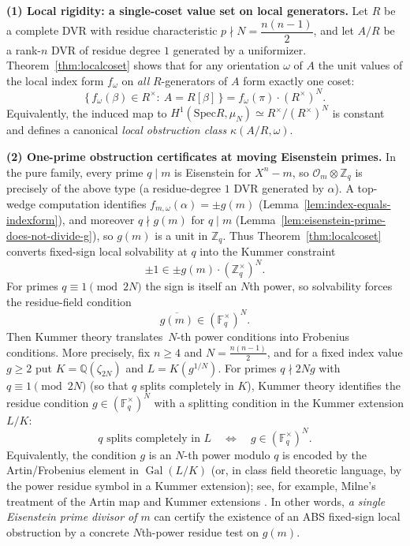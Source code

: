 \documentclass[11pt,letterpaper]{amsart}
\newcommand{\Z}{\mathbb{Z}}
\newcommand{\Q}{\mathbb{Q}}
\newcommand{\F}{\mathbb{F}}
\newcommand{\Ocal}{\mathcal{O}}
\newcommand{\Gal}{\operatorname{Gal}}
\newcommand{\Spec}{\mathrm{Spec}}
\theoremstyle{plain}
\theoremstyle{definition}
\theoremstyle{remark}
\theoremstyle{plain}
\begin{document}
\smallskip\noindent
\textbf{(1) Local rigidity: a single-coset value set on local generators.}
Let $R$ be a complete DVR with residue characteristic $p\nmid N=\dfrac{n(n-1)}{2}$, and let $A/R$ be a rank-$n$ DVR of residue degree $1$ generated by a uniformizer.
Theorem~\ref{thm:localcoset} shows that for any orientation $\omega$ of $A$
the unit values of the local index form $f_\omega$ on \emph{all} $R$-generators of $A$ form exactly one coset:
\[
\{\,f_\omega(\beta)\in R^\times:\ A=R[\beta]\,\}
=
f_\omega(\pi)\cdot (R^\times)^N.
\]
Equivalently, the induced map to $H^1(\Spec R,\mu_N)\simeq R^\times/(R^\times)^N$ is constant and defines
a canonical \emph{local obstruction class} $\kappa(A/R,\omega)$.

\smallskip\noindent
\textbf{(2) One-prime obstruction certificates at moving Eisenstein primes.}
In the pure family, every prime $q\mid m$ is Eisenstein for $X^n-m$, so
$\Ocal_m\otimes\Z_q$ is precisely of the above type (a residue-degree $1$ DVR generated by $\alpha$). A top-wedge computation identifies $f_{m,\omega}(\alpha)=\pm g(m)$ (Lemma~\ref{lem:index-equals-indexform}),
and moreover $q\nmid g(m)$ for $q\mid m$ (Lemma~\ref{lem:eisenstein-prime-does-not-divide-g}),
so $g(m)$ is a unit in $\Z_q$.
Thus Theorem~\ref{thm:localcoset} converts fixed-sign local solvability at $q$ into the Kummer constraint
\[
\pm 1\in \pm g(m)\cdot(\Z_q^\times)^N.
\]
For primes $q\equiv 1\pmod{2N}$ the sign is itself an $N$th power, so solvability forces the residue-field condition
\[
\overline{g(m)}\in(\F_q^\times)^N.
\]
Then Kummer theory translates \(\,N\)-th power conditions into Frobenius conditions. More precisely, fix \(n\ge 4\) and \(N=\frac{n(n-1)}2\), and for a fixed index value \(g\ge 2\) put
\(K=\Q(\zeta_{2N})\) and \(L=K(g^{1/N})\).
For primes \(q\nmid 2Ng\) with \(q\equiv 1\pmod{2N}\) (so that \(q\) splits completely in \(K\)),
Kummer theory identifies the residue condition \(g\in (\F_q^\times)^N\) with a splitting condition in the
Kummer extension \(L/K\):
\[
q \text{ splits completely in }L
\quad\Longleftrightarrow\quad
g\in (\F_q^\times)^N.
\]
Equivalently, the condition \(g\) is an \(N\)-th power modulo \(q\) is encoded by the Artin/Frobenius element in \(\Gal(L/K)\) (or, in class field theoretic language, by the power residue symbol in a Kummer extension); see, for example, Milne's treatment of the Artin map and Kummer extensions \cite[\S IV.4--IV.5]{MilneCFT}. In other words, \emph{a single Eisenstein prime divisor of $m$} can certify the existence of an ABS fixed-sign local obstruction by a concrete $N$th-power residue test on $g(m)$.
\end{document}
